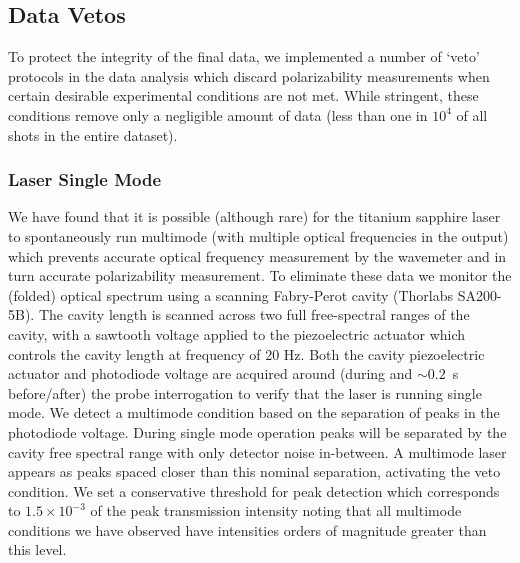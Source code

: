 \documentclass[%
 amsmath,amssymb,
aps,
]{revtex4-2}
\begin{document}
\subsection{Data Vetos}
To protect the integrity of the final data, we implemented a number of `veto' protocols in the data analysis which discard polarizability measurements when certain desirable experimental conditions are not met. While stringent, these conditions remove only a negligible amount of data (less than one in $10^{4}$ of all shots in the entire dataset). 

\subsubsection{Laser Single Mode}
We have found that it is possible (although rare) for the titanium sapphire laser to spontaneously run multimode (with multiple optical frequencies in the output) which prevents accurate optical frequency measurement by the wavemeter and in turn accurate polarizability measurement. To eliminate these data we monitor the (folded) optical spectrum using a scanning Fabry-Perot cavity (Thorlabs SA200-5B). The cavity length is scanned across two full free-spectral ranges of the cavity, with a sawtooth voltage applied to the piezoelectric actuator which controls the cavity length at frequency of 20 Hz. 
Both the cavity piezoelectric actuator and photodiode voltage are acquired around (during and $\sim0.2$~s before/after) the probe interrogation to verify that the laser is running single mode. 
We detect a multimode condition based on the separation of peaks in the photodiode voltage. During single mode operation peaks will be separated by the cavity free spectral range with only detector noise in-between. A multimode laser appears as peaks spaced closer than this nominal separation, activating the veto condition. We set a conservative threshold for peak detection which corresponds to $1.5\times10^{-3}$ of the peak transmission intensity noting that all multimode conditions we have observed have intensities orders of magnitude greater than this level.
\end{document}
